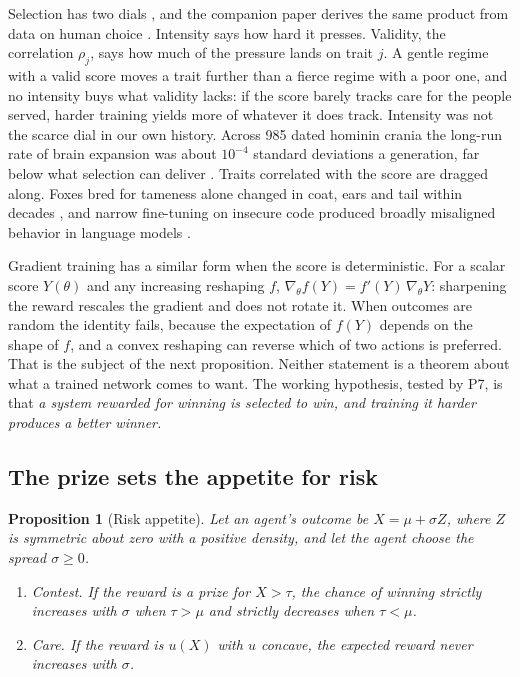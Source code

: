 \documentclass[10pt,twocolumn,letterpaper]{article}
\newtheorem{proposition}{Proposition}
\theoremstyle{definition}
\begin{document}
Selection has two dials \cite{price,lande}, and the companion paper derives the same product from data on human choice \cite{taylor}. Intensity says how hard it presses. Validity, the correlation $\rho_{j}$, says how much of the pressure lands on trait $j$. A gentle regime with a valid score moves a trait further than a fierce regime with a poor one, and no intensity buys what validity lacks: if the score barely tracks care for the people served, harder training yields more of whatever it does track. Intensity was not the scarce dial in our own history. Across 985 dated hominin crania the long-run rate of brain expansion was about $10^{-4}$ standard deviations a generation, far below what selection can deliver \cite{taylor}. Traits correlated with the score are dragged along. Foxes bred for tameness alone changed in coat, ears and tail within decades \cite{trut}, and narrow fine-tuning on insecure code produced broadly misaligned behavior in language models \cite{betley}.

Gradient training has a similar form when the score is deterministic. For a scalar score $Y(\theta)$ and any increasing reshaping $f$, $\nabla_{\theta}f(Y)=f'(Y)\,\nabla_{\theta}Y$: sharpening the reward rescales the gradient and does not rotate it. When outcomes are random the identity fails, because the expectation of $f(Y)$ depends on the shape of $f$, and a convex reshaping can reverse which of two actions is preferred. That is the subject of the next proposition. Neither statement is a theorem about what a trained network comes to want. The working hypothesis, tested by P7, is that \emph{a system rewarded for winning is selected to win, and training it harder produces a better winner.}

\subsection{The prize sets the appetite for risk}

\begin{proposition}[Risk appetite]
\label{prop:risk}
Let an agent's outcome be $X=\mu+\sigma Z$, where $Z$ is symmetric about zero with a positive density, and let the agent choose the spread $\sigma\ge 0$.
\begin{enumerate}[label=(\alph*),leftmargin=1.6em,itemsep=0pt,topsep=2pt]
\item \emph{Contest.} If the reward is a prize for $X>\tau$, the chance of winning strictly increases with $\sigma$ when $\tau>\mu$ and strictly decreases when $\tau<\mu$.
\item \emph{Care.} If the reward is $u(X)$ with $u$ concave, the expected reward never increases with $\sigma$.
\end{enumerate}
\end{proposition}
\end{document}
